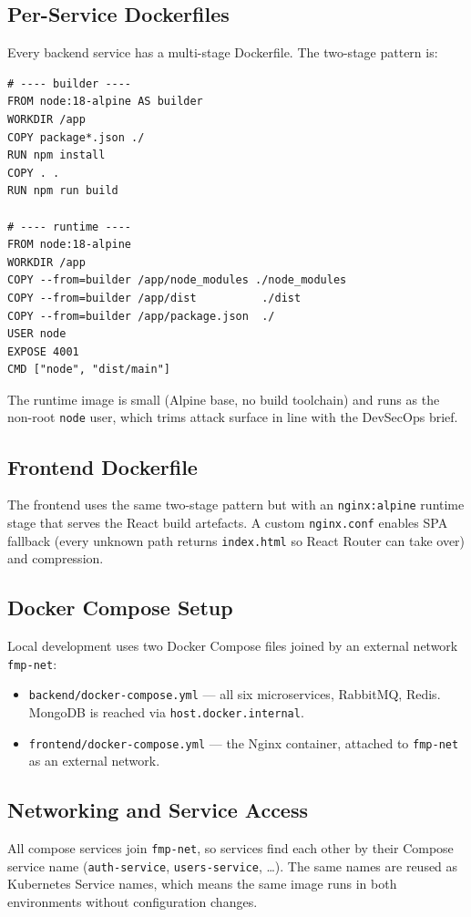 \documentclass[11pt,a4paper]{article}
\begin{document}
\subsection{Per-Service Dockerfiles}
Every backend service has a multi-stage Dockerfile.  The two-stage
pattern is:

\begin{lstlisting}[caption={Two-stage Dockerfile pattern (auth-service).}]
# ---- builder ----
FROM node:18-alpine AS builder
WORKDIR /app
COPY package*.json ./
RUN npm install
COPY . .
RUN npm run build

# ---- runtime ----
FROM node:18-alpine
WORKDIR /app
COPY --from=builder /app/node_modules ./node_modules
COPY --from=builder /app/dist          ./dist
COPY --from=builder /app/package.json  ./
USER node
EXPOSE 4001
CMD ["node", "dist/main"]
\end{lstlisting}

The runtime image is small (Alpine base, no build toolchain) and
runs as the non-root \texttt{node} user, which trims attack surface
in line with the DevSecOps brief.

\subsection{Frontend Dockerfile}
The frontend uses the same two-stage pattern but with an
\texttt{nginx:alpine} runtime stage that serves the React build
artefacts.  A custom \texttt{nginx.conf} enables SPA fallback (every
unknown path returns \texttt{index.html} so React Router can take
over) and compression.

\subsection{Docker Compose Setup}
Local development uses two Docker Compose files joined by an external
network \texttt{fmp-net}:

\begin{itemize}[leftmargin=*]
  \item \texttt{backend/docker-compose.yml} — all six microservices,
        RabbitMQ, Redis.  MongoDB is reached via
        \texttt{host.docker.internal}.
  \item \texttt{frontend/docker-compose.yml} — the Nginx container,
        attached to \texttt{fmp-net} as an external network.
\end{itemize}

\subsection{Networking and Service Access}
All compose services join \texttt{fmp-net}, so services find each
other by their Compose service name (\texttt{auth-service},
\texttt{users-service}, \dots).  The same names are reused as
Kubernetes Service names, which means the same image runs in both
environments without configuration changes.
\end{document}
